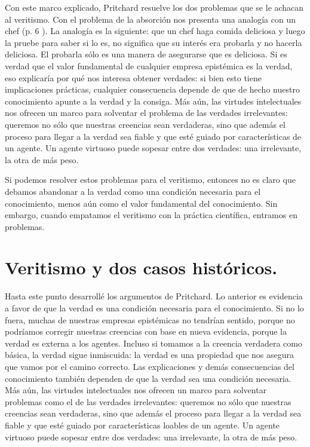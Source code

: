 \documentclass{article}
\begin{document}
Con este marco explicado, Pritchard resuelve los dos problemas que se le achacan al veritismo. Con el problema de la absorción nos presenta una analogía con un chef (p. 6 ). La analogía es la siguiente: que un chef haga comida deliciosa y luego la pruebe para saber si lo es, no significa que su interés era probarla y no hacerla deliciosa. El probarla sólo es una manera de asegurarse que es deliciosa. Si es verdad que el valor fundamental de cualquier empresa epistémica es la verdad, eso explicaría por qué nos interesa obtener verdades: si bien esto tiene implicaciones prácticas, cualquier consecuencia depende de que de hecho nuestro conocimiento apunte a la verdad y la consiga. Más aún, las virtudes intelectuales nos ofrecen un marco para solventar el problema de las verdades irrelevantes: queremos no sólo que nuestras creencias sean verdaderas, sino que además el proceso para llegar a la verdad sea fiable y que esté guiado por características de un agente. Un agente virtuoso puede sopesar entre dos verdades: una irrelevante, la otra de más peso.

Si podemos resolver estos problemas para el veritismo, entonces no es claro que debamos abandonar a la verdad como una condición necesaria para el conocimiento, menos aún como el valor fundamental del conocimiento. Sin embargo, cuando empatamos el veritismo con la práctica científica, entramos en problemas.

\section{Veritismo y dos casos históricos.}

\noindent Hasta este punto desarrollé los argumentos de Pritchard. Lo anterior es evidencia a favor de que la verdad es una condición necesaria para el conocimiento. Si no lo fuera, muchas de nuestras empresas epistémicas no tendrían sentido, porque no podríamos corregir nuestras creencias con base en nueva evidencia, porque la verdad es externa a los agentes. Incluso si tomamos a la creencia verdadera como básica, la verdad sigue inmiscuida: la verdad es una propiedad que nos asegura que vamos por el camino correcto. Las explicaciones y demás consecuencias del conocimiento también dependen de que la verdad sea una condición necesaria. Más aún, las virtudes intelectuales nos ofrecen un marco para solventar problemas como el de las verdades irrelevantes: queremos no sólo que nuestras creencias sean verdaderas, sino que además el proceso para llegar a la verdad sea fiable y que esté guiado por características loables de un agente. Un agente virtuoso puede sopesar entre dos verdades: una irrelevante, la otra de más peso.
\end{document}
